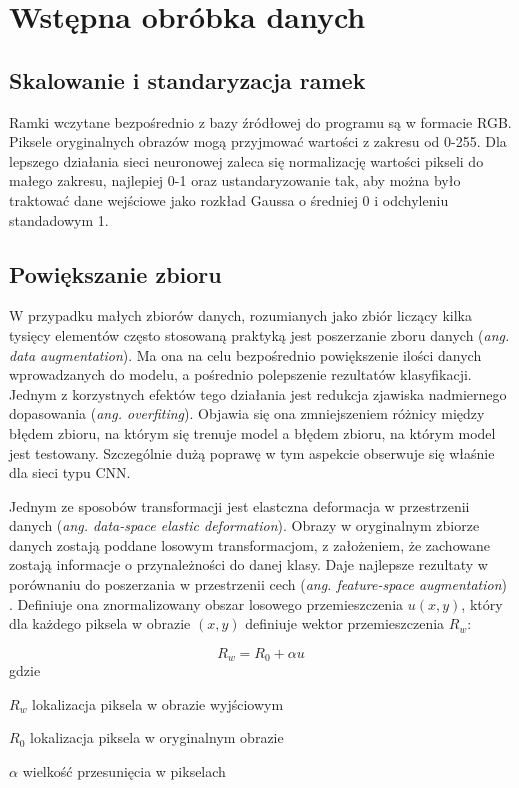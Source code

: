 \section{Wstępna obróbka danych}
\subsection{Skalowanie i standaryzacja ramek}
Ramki wczytane bezpośrednio z bazy źródłowej do programu są w formacie RGB. Piksele oryginalnych obrazów mogą przyjmować wartości z zakresu od 0-255. Dla lepszego działania sieci neuronowej zaleca się normalizację wartości pikseli do małego zakresu, najlepiej 0-1 oraz ustandaryzowanie tak, aby można było traktować dane wejściowe jako rozkład Gaussa o średniej 0 i odchyleniu standadowym 1.

\subsection{Powiększanie zbioru}
W przypadku małych zbiorów danych, rozumianych jako zbiór liczący kilka tysięcy elementów często stosowaną praktyką jest poszerzanie zboru danych (\textit{ang. data augmentation}). Ma ona na celu bezpośrednio powiększenie ilości danych wprowadzanych do modelu, a pośrednio polepszenie rezultatów klasyfikacji. Jednym z korzystnych efektów tego działania jest redukcja zjawiska nadmiernego dopasowania (\textit{ang. overfiting}). Objawia się ona zmniejszeniem różnicy między błędem zbioru, na którym się trenuje model a błędem zbioru, na którym model jest testowany. Szczególnie dużą poprawę w tym aspekcie obserwuje się właśnie dla sieci typu CNN. \cite{Wong2016UnderstandingDA}

Jednym ze sposobów transformacji jest elastczna deformacja w przestrzenii danych (\textit{ang. data-space elastic deformation}). Obrazy w oryginalnym zbiorze danych zostają poddane losowym transformacjom, z założeniem, że zachowane zostają informacje o przynależności do danej klasy. Daje najlepsze rezultaty w porównaniu do poszerzania w przestrzenii cech (\textit{ang. feature-space augmentation}) \cite{augmentation}. Definiuje ona znormalizowany obszar losowego przemieszczenia \(u(x,y)\), który dla każdego piksela w obrazie \((x,y)\) definiuje wektor przemieszczenia \(R_w\):

\begin{equation}
R_w = R_0 + \alpha u
\end{equation}
gdzie
\begin{eqwhere}[2cm]
	\item[$R_w$] lokalizacja piksela w obrazie wyjściowym
	\item[$R_0$] lokalizacja piksela w oryginalnym obrazie
	\item[$\alpha$] wielkość przesunięcia w pikselach
\end{eqwhere}

